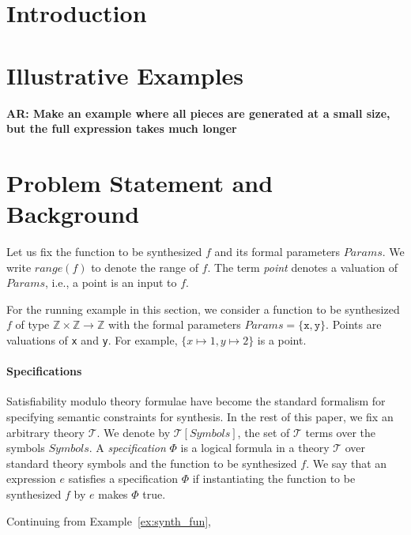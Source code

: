 \documentclass{llncs}
\newcommand\arsays[1]{{\bf AR: #1}}
\newcommand\Integers{\mathbb{Z}}
\newcommand\Expr{e}
\newcommand\Spec{\Phi}
\newcommand\SynthFun{f}
\newcommand\range{\mathit{range}}
\newcommand\FormalParameters{\mathit{Params}}
\newcommand\Symbols{\mathit{Symbols}}
\newcommand\Theory{\mathcal{T}}
\begin{document}
\section{Introduction}
\label{sec:intro}

\section{Illustrative Examples}
\label{sec:example}

\arsays{Make an example where all pieces are generated at a small size,
but the full expression takes much longer}


\section{Problem Statement and Background}
\label{sec:problem}

Let us fix the function to be synthesized $\SynthFun$ and its formal
parameters $\FormalParameters$.
We write $\range(\SynthFun)$ to denote the range of $\SynthFun$.
The term {\em point} denotes a valuation of $\FormalParameters$, i.e., a
point is an input to $\SynthFun$.

\begin{example}
  For the running example in this section, we consider a function to be
  synthesized $\SynthFun$ of type $\Integers \times \Integers \to
  \Integers$ with the formal parameters $\FormalParameters = \{
  \mathtt{x}, \mathtt{y} \}$.
  Points are valuations of {\tt x} and {\tt y}. 
  For example, $\{ x \mapsto 1, y \mapsto 2 \}$ is a point.
\end{example}

\paragraph{Specifications}
Satisfiability modulo theory formulae have become the standard formalism
for specifying semantic constraints for synthesis.
In the rest of this paper, we fix an arbitrary theory $\Theory$.
We denote by $\Theory[\Symbols]$, the set of $\Theory$ terms over
the symbols $\Symbols$.
A {\em specification} $\Spec$ is a logical formula in a theory $\Theory$
over standard theory symbols and the function to be synthesized
$\SynthFun$.
We say that an expression $\Expr$ satisfies a specification $\Spec$ if
instantiating the function to be synthesized $\SynthFun$ by $\Expr$
makes $\Spec$ true.

\begin{example}
  Continuing from Example~\ref{ex:synth_fun}, 
\end{example}
\end{document}
